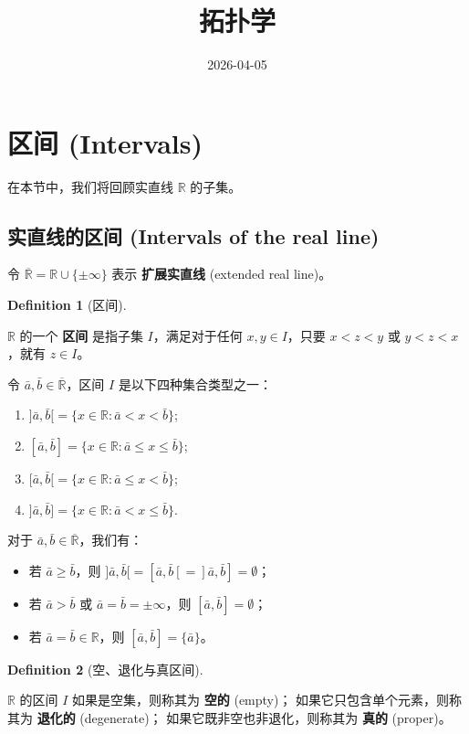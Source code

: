 \documentclass[
  a4paper,
]{article}
\title{拓扑学}
\author{}
\date{2026-04-05}
\providecommand{\tightlist}{%
  \setlength{\itemsep}{0pt}\setlength{\parskip}{0pt}}
\newtheorem{definition}{定义}[section]
\theoremstyle{definition}
\newtheorem{definition}{Definition}[section]
\theoremstyle{remark}
\begin{document}
\maketitle


\section{区间 (Intervals)}\label{ux533aux95f4-intervals}

在本节中，我们将回顾实直线 \(\mathbb{R}\) 的子集。

\subsection{实直线的区间 (Intervals of the real
line)}\label{ux5b9eux76f4ux7ebfux7684ux533aux95f4-intervals-of-the-real-line}

令 \(\overline{\mathbb{R}} = \mathbb{R} \cup \{\pm\infty\}\) 表示
\textbf{扩展实直线} (extended real line)。

\begin{definition}[区间]\protect\hypertarget{def-interval}{}\label{def-interval}

\(\mathbb{R}\) 的一个 \textbf{区间} 是指子集 \(I\)，满足对于任何
\(x, y \in I\)，只要 \(x < z < y\) 或 \(y < z < x\)，就有 \(z \in I\)。

令 \(\bar{a}, \bar{b} \in \overline{\mathbb{R}}\)，区间 \(I\)
是以下四种集合类型之一：

\begin{enumerate}
\def\labelenumi{\arabic{enumi}.}
\tightlist
\item
  \(]\bar{a}, \bar{b}[ = \{x \in \mathbb{R} : \bar{a} < x < \bar{b}\}\);
\item
  \([\bar{a}, \bar{b}] = \{x \in \mathbb{R} : \bar{a} \leq x \leq \bar{b}\}\);
\item
  \([\bar{a}, \bar{b}[ = \{x \in \mathbb{R} : \bar{a} \leq x < \bar{b}\}\);
\item
  \(]\bar{a}, \bar{b}] = \{x \in \mathbb{R} : \bar{a} < x \leq \bar{b}\}\).
\end{enumerate}

\end{definition}

对于 \(\bar{a}, \bar{b} \in \overline{\mathbb{R}}\)，我们有：

\begin{itemize}
\tightlist
\item
  若 \(\bar{a} \geq \bar{b}\)，则
  \(]\bar{a}, \bar{b}[ = [\bar{a}, \bar{b}[ = ]\bar{a}, \bar{b}] = \emptyset\)；
\item
  若 \(\bar{a} > \bar{b}\) 或 \(\bar{a} = \bar{b} = \pm\infty\)，则
  \([\bar{a}, \bar{b}] = \emptyset\)；
\item
  若 \(\bar{a} = \bar{b} \in \mathbb{R}\)，则
  \([\bar{a}, \bar{b}] = \{\bar{a}\}\)。
\end{itemize}

\begin{definition}[空、退化与真区间]\protect\hypertarget{def-interval-types}{}\label{def-interval-types}

\(\mathbb{R}\) 的区间 \(I\) 如果是空集，则称其为 \textbf{空的} (empty)；
如果它只包含单个元素，则称其为 \textbf{退化的} (degenerate)；
如果它既非空也非退化，则称其为 \textbf{真的} (proper)。

\end{definition}
\end{document}
